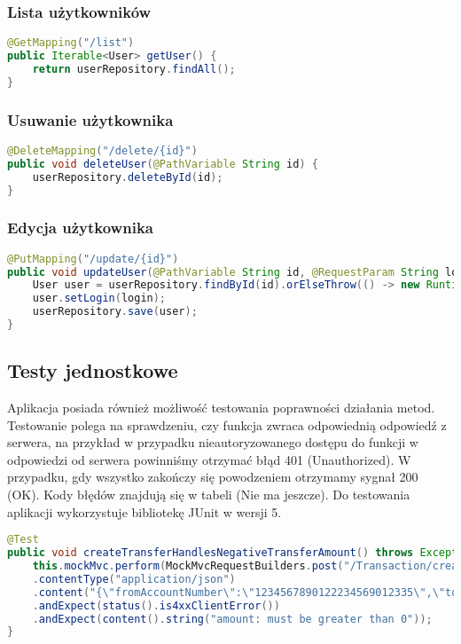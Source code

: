 \subsubsection*{Lista użytkowników}
\begin{lstlisting}[language={Java}, caption={Lista użytkowników}, label={lst:java-list}]
@GetMapping("/list")
public Iterable<User> getUser() {
	return userRepository.findAll();
}
\end{lstlisting}
\subsubsection*{Usuwanie użytkownika}
\begin{lstlisting}[language={Java}, caption={Usuwanie użytkownika}, label={lst:java-delete}]
@DeleteMapping("/delete/{id}")
public void deleteUser(@PathVariable String id) {
	userRepository.deleteById(id);
}
\end{lstlisting}
\subsubsection*{Edycja użytkownika}
\begin{lstlisting}[language={Java}, caption={Edycja użytkownika}, label={lst:java-update}]
@PutMapping("/update/{id}")
public void updateUser(@PathVariable String id, @RequestParam String login) {
	User user = userRepository.findById(id).orElseThrow(() -> new RuntimeException("User not found"));
	user.setLogin(login);
	userRepository.save(user);
}
\end{lstlisting}
\subsection*{Testy jednostkowe}
Aplikacja posiada również możliwość testowania poprawności działania metod. Testowanie polega na sprawdzeniu, czy funkcja zwraca odpowiednią odpowiedź z serwera, na przykład w przypadku nieautoryzowanego dostępu do funkcji w odpowiedzi od serwera powinniśmy otrzymać błąd 401 (Unauthorized). W przypadku, gdy wszystko zakończy się powodzeniem otrzymamy sygnał 200 (OK). Kody błędów znajdują się w tabeli (Nie ma jeszcze). Do testowania aplikacji wykorzystuje bibliotekę JUnit w wersji 5.
\begin{lstlisting}[language={Java}, caption={Przykładowy test}, label={lst:java-UnitTest}]
@Test
public void createTransferHandlesNegativeTransferAmount() throws Exception {
	this.mockMvc.perform(MockMvcRequestBuilders.post("/Transaction/create/transfer")
	.contentType("application/json")
	.content("{\"fromAccountNumber\":\"1234567890122234569012335\",\"toAccountNumber\":\"1234567890122234569012335\",\"amount\":-50.0}"))
	.andExpect(status().is4xxClientError())
	.andExpect(content().string("amount: must be greater than 0"));
}
\end{lstlisting}
